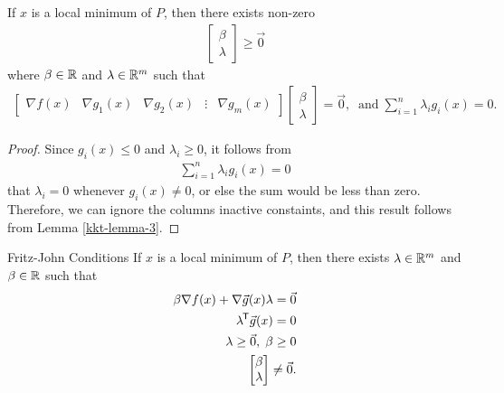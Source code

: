 \begin{lemma}\label{kkt-lemma-4}
    If $x$ is a local minimum of $P$, then there exists non-zero
    \begin{align*}
        \begin{bmatrix}
            \beta \\ \lambda
        \end{bmatrix} \geq \vec{0}
    \end{align*}
    where $\beta \in \mathbb{R}$ and $\lambda \in \mathbb{R}^m$ such that
    \begin{align*}
        \left[\begin{array}{c|c|c|c|c}
            \nabla f(x) & \nabla g_1(x) & \nabla g_2(x) & \vdots & \nabla g_m(x)
        \end{array}\right]\begin{bmatrix}
            \beta \\ \lambda
        \end{bmatrix} = \vec{0},\;\;\textrm{and}\;\sum_{i=1}^{n}\lambda_ig_i(x) = 0.
    \end{align*}
\end{lemma}

\begin{proof}
    Since $g_i(x) \leq 0$ and $\lambda_i \geq 0$, it follows from
    \begin{align*}
        \sum_{i=1}^{n}\lambda_ig_i(x) = 0
    \end{align*}
    that $\lambda_i = 0$ whenever $g_i(x) \neq 0$, or else the sum would be less than zero. Therefore, we can ignore the columns inactive constaints, and this result follows from Lemma \ref{kkt-lemma-3}.
\end{proof}

\begin{thm}{Fritz-John Conditions}\label{fritz-john-conditions}\proofbreak
    If $x$ is a local minimum of $P$, then there exists $\lambda \in \mathbb{R}^m$ and $\beta \in \mathbb{R}$ such that
    \begin{align*}
        \beta\nabla f(x) + \nabla \vec{g}(x)\lambda = \vec{0} \\
        {\lambda}^{\mkern-1.5mu\mathsf{T}}\vec{g}(x) = 0 \\
        \lambda \geq \vec{0},\;\beta \geq 0 \\
        \begin{bmatrix}
            \beta \\ \lambda
        \end{bmatrix} \neq \vec{0}.
    \end{align*}
\end{thm}

